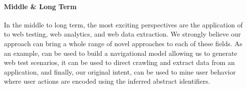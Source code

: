 \paragraph{Middle \& Long Term}
In the middle to long term, the most exciting perspectives are the application of \appstract{} to web testing, web analytics, and web data extraction. We strongly believe our approach can bring a whole range of novel approaches to each of these fields. As an example, \appstract{} can be used to build a navigational model allowing us to generate web test scenarios, it can be used to direct crawling and extract data from an application, and finally, our original intent, \appstract{} can be used to mine user behavior where user actions are encoded using the inferred abstract identifiers.


